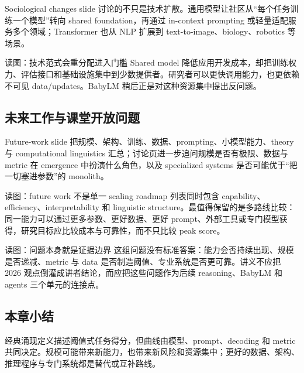 Sociological changes slide 讨论的不只是技术扩散。通用模型让社区从“每个任务训练一个模型”转向 shared foundation，再通过 in-context prompting 或轻量适配服务多个领域；Transformer 也从 NLP 扩展到 text-to-image、biology、robotics 等场景。


\begin{knowledgebox}{读图：技术范式会重分配进入门槛}
Shared model 降低应用开发成本，却把训练权力、评估接口和基础设施集中到少数提供者。研究者可以更快调用能力，也更依赖不可见 data/updates。BabyLM 稍后正是对这种资源集中提出反问题。
\end{knowledgebox}

\subsection{未来工作与课堂开放问题}

Future-work slide 把规模、架构、训练、数据、prompting、小模型能力、theory 与 computational linguistics 汇总；讨论页进一步追问规模是否有极限、数据与 metric 在 emergence 中扮演什么角色，以及 specialized systems 是否可能优于“把一切塞进参数”的 monolith。


\begin{knowledgebox}{读图：future work 不是单一 scaling roadmap}
列表同时包含 capability、efficiency、interpretability 和 linguistic structure。最值得保留的是多路线比较：同一能力可以通过更多参数、更好数据、更好 prompt、外部工具或专门模型获得，研究目标应比较成本与可靠性，而不只比较 peak score。
\end{knowledgebox}


\begin{knowledgebox}{读图：问题本身就是证据边界}
这组问题没有标准答案：能力会否持续出现、规模是否递减、metric 与 data 是否制造阈值、专业系统是否更可靠。讲义不应把 2026 观点倒灌成讲者结论，而应把这些问题作为后续 reasoning、BabyLM 和 agents 三个单元的连接点。
\end{knowledgebox}


\subsection{本章小结}

经典涌现定义描述阈值式任务得分，但曲线由模型、prompt、decoding 和 metric 共同决定。规模可能带来新能力，也带来新风险和资源集中；更好的数据、架构、推理程序与专门系统都是替代或互补路线。

